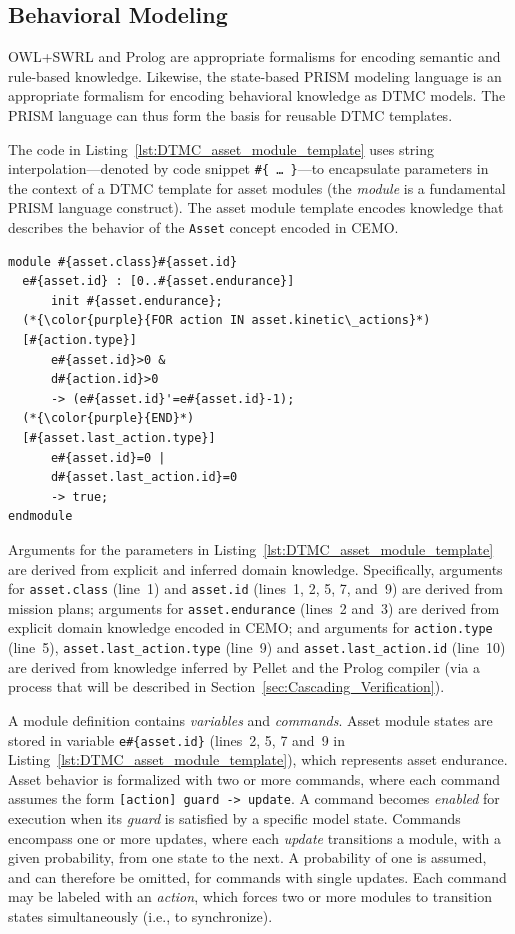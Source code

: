 \subsection{Behavioral Modeling}
\label{sec:Behavioral_Modeling}

\noindent OWL+SWRL and Prolog are appropriate formalisms for encoding semantic and rule-based knowledge. Likewise, the state-based PRISM modeling language is an appropriate formalism for encoding behavioral knowledge as DTMC models. The PRISM language can thus form the basis for re\-usable DTMC templates.

The code in Listing~\ref{lst:DTMC_asset_module_template} uses string interpolation---denoted by code snippet \texttt{\#\{ \ldots\ \}}---to encapsulate parameters in the context of a DTMC template for asset modules (the \emph{module} is a fundamental PRISM language construct). The asset module template encodes knowledge that describes the behavior of the \texttt{Asset} concept encoded in CEMO\@.

\begin{lstlisting}[caption={DTMC template for asset modules},label=lst:DTMC_asset_module_template]
module #{asset.class}#{asset.id}
  e#{asset.id} : [0..#{asset.endurance}]
      init #{asset.endurance};
  (*{\color{purple}{FOR action IN asset.kinetic\_actions}*)
  [#{action.type}]
      e#{asset.id}>0 &
      d#{action.id}>0
      -> (e#{asset.id}'=e#{asset.id}-1);
  (*{\color{purple}{END}*)
  [#{asset.last_action.type}]
      e#{asset.id}=0 |
      d#{asset.last_action.id}=0
      -> true;
endmodule
\end{lstlisting}

Arguments for the parameters in Listing~\ref{lst:DTMC_asset_module_template} are derived from explicit and inferred domain knowledge. Specifically, arguments for \texttt{asset.class} (line~1) and \texttt{asset.id} (lines~1, 2, 5, 7, and~9) are derived from mission plans; arguments for \texttt{asset.endurance} (lines~2 and~3) are derived from explicit domain knowledge encoded in CEMO; and arguments for \texttt{action.type} (line~5), \texttt{asset.last\_action.type} (line~9) and \texttt{asset.last\_action.id} (line~10) are derived from knowledge inferred by Pellet and the Prolog compiler (via a process that will be described in Section~\ref{sec:Cascading_Verification}).

A module definition contains \emph{variables} and \emph{commands}. Asset module states are stored in variable \texttt{e\#\{asset.id\}} (lines~2, 5, 7 and~9 in Listing~\ref{lst:DTMC_asset_module_template}), which represents asset endurance. Asset behavior is formalized with two or more commands, where each command assumes the form \texttt{[action] guard -> update}. A command becomes \emph{enabled} for execution when its \emph{guard} is satisfied by a specific model state. Commands encompass one or more updates, where each \emph{update} transitions a module, with a given probability, from one state to the next. A probability of one is assumed, and can therefore be omitted, for commands with single updates. Each command may be labeled with an \emph{action}, which forces two or more modules to transition states simultaneously (i.e., to synchronize).

